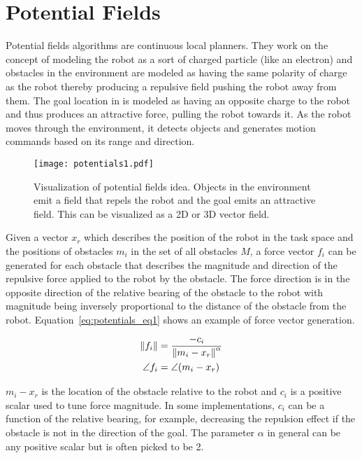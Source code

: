 \section{Potential Fields}\label{sec:navpotfields}
Potential fields algorithms are continuous local planners. They work on the concept of modeling the robot as a sort of
charged particle (like an electron) and obstacles in the environment are modeled as having the same polarity of charge as the robot thereby producing a repulsive field pushing the robot away
from them. The goal location in is modeled as having an opposite charge to the robot and thus produces an attractive force, pulling the robot towards it. As the robot moves through
the environment, it detects objects and generates motion commands based on its range and direction. 
\begin{figure}
\centering
\texttt{[image: potentials1.pdf]}
\caption{Visualization of potential fields idea. Objects in the environment emit a field that repels the robot
         and the goal emits an attractive field. This can be visualized as a 2D or 3D vector field.}
\label{fig:potentials1}
\end{figure}

Given a vector $x_r$ which describes the position of the robot in the task space and the positions of obstacles
$m_i$ in the set of all obstacles $M$, a force vector $f_i$ can be generated for each obstacle that describes the 
magnitude and direction of the repulsive force applied to the robot by the obstacle. The force direction
is in the opposite direction of the relative bearing of the obstacle to the robot with magnitude being inversely
proportional to the distance of the obstacle from the robot. Equation~\ref{eq:potentials_eq1} shows an example
of force vector generation.

\begin{align}
	\left\lVert f_i\right\rVert  &= \frac{-c_i}{\left\lVert m_i - x_r\right\rVert^\alpha}\\
	\angle{f_i} &= \angle(m_i - x_r)
\label{eq:potentials_eq1}
\end{align}

$m_i - x_r$ is the location of the obstacle relative to the robot and $c_i$ is a positive scalar used to tune force
magnitude. In some implementations, $c_i$ can be a function of the relative bearing, for example, decreasing the repulsion
effect if the obstacle is not in the direction of the goal. The parameter $\alpha$ in general can be any positive scalar
but is often picked to be 2.

